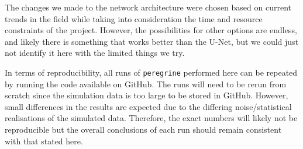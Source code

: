 The changes we made to the network architecture were chosen based on current trends in the field while taking into consideration the time and resource constraints of the project. However, the possibilities for other options are endless, and likely there is something that works better than the U-Net, but we could just not identify it here with the limited things we try.

In terms of reproducibility, all runs of \texttt{peregrine} performed here can be repeated by running the code available on GitHub. The runs will need to be rerun from scratch since the simulation data is too large to be stored in GitHub. However, small differences in the results are expected due to the differing noise/statistical realisations of the simulated data. Therefore, the exact numbers will likely not be reproducible but the overall conclusions of each run should remain consistent with that stated here.









